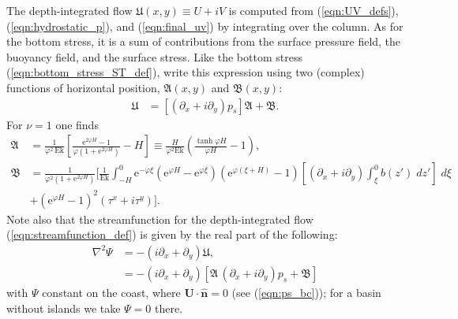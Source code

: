 \documentclass{ametsocV6.2}
\begin{document}
The depth-integrated flow $\mathfrak{U} (x,y) \equiv U + i V$ is computed from (\ref{eqn:UV_defs}), (\ref{eqn:hydrostatic_p}), and (\ref{eqn:final_uv}) by integrating over the column.
As for the bottom stress, it is a sum of contributions from the surface pressure field, the buoyancy field, and the surface stress.
Like the bottom stress (\ref{eqn:bottom_stress_ST_def}), write this expression using two (complex) functions of horizontal position, $\mathfrak{A} (x,y)$ and $\mathfrak{B} (x,y)$:
\begin{align}
\mathfrak{U} & = \left[ \left( \partial_x + i \partial_y \right) p_s \right] \mathfrak{A}  + \mathfrak{B} .
\label{eqn:UV_AB_def}
\end{align}
For $\nu = 1$ one finds
\begin{align}
\mathfrak{A} & = 
\frac{1}{\varphi^2 \, \mathrm{Ek}} \left[ \frac{ \mathrm{e}^{2 \varphi H} - 1 }{\varphi  \left(1 + \mathrm{e}^{2 \varphi H} \right)} - H \right]
\equiv \frac{H}{\varphi^2 \mathrm{Ek}} \left( \frac{\tanh \varphi H}{\varphi H} - 1\right)
, \label{eqn:A_fn} \\
\mathfrak{B} & =
\frac{1}{{ \varphi^2 \left(1 + \mathrm{e}^{2 \varphi H} \right)} } 
\Bigg[ \frac{1}{\mathrm{Ek}} \int_{-H}^{0} 
\mathrm{e}^{-\varphi \xi} 
\left(
\mathrm{e}^{\varphi H}  - \mathrm{e}^{\varphi \xi}
\right) \left(
\mathrm{e}^{\varphi  \left( \xi + H \right)} - 1
\right)
 \left[ \left( \partial_x + i \partial_y \right) \int_{\xi}^{0} b(z') \; dz'  \right] \; d \xi   \nonumber  \\
& +
\left( 
\mathrm{e}^{\varphi H }   - 1   
\right)^2
\left( \tau^x + i \tau^y \right) \Bigg]  .
\label{eqn:B_fn}
\end{align}
Note also that the streamfunction for the depth-integrated flow (\ref{eqn:streamfunction_def}) is given by the real part of the following:
\begin{align}
\nabla^2 \Psi & =  - \left( i \partial_x + \partial_y \right) \mathfrak{U} , \nonumber \\
& =  - \left( i \partial_x + \partial_y \right) \left[ \mathfrak{A}\,\left( \partial_x + i \partial_y \right) p_s  + \mathfrak{B} \right] 
\label{eqn:streamfunction_pde}
\end{align}
with $\Psi$ constant on the coast, where $\mathbf{U} \cdot \hat{\mathbf{n}} = 0$ (see (\ref{eqn:ps_bc})); for a basin without islands we take $\Psi = 0$ there.
\end{document}
